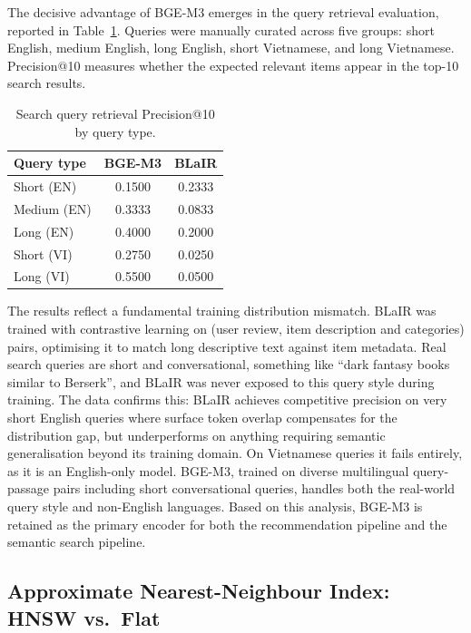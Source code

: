 The decisive advantage of BGE-M3 emerges in the query retrieval evaluation, reported in Table~\ref{tab:query_retrieval}.
Queries were manually curated across five groups: short English, medium English, long English, short Vietnamese, and long Vietnamese.
Precision@10 measures whether the expected relevant items appear in the top-10 search results.

\begin{table}[H]
\centering
\caption{Search query retrieval Precision@10 by query type.}
\label{tab:query_retrieval}
\begin{tabular}{lcc}
\hline
\textbf{Query type} & \textbf{BGE-M3} & \textbf{BLaIR} \\
\hline
Short (EN)    & 0.1500 & 0.2333 \\
Medium (EN)   & 0.3333 & 0.0833 \\
Long (EN)     & 0.4000 & 0.2000 \\
Short (VI)    & 0.2750 & 0.0250 \\
Long (VI)     & 0.5500 & 0.0500 \\
\hline
\end{tabular}
\end{table}

The results reflect a fundamental training distribution mismatch.
BLaIR was trained with contrastive learning on (user review, item description and categories) pairs, optimising it to match long descriptive text against item metadata.
Real search queries are short and conversational, something like ``dark fantasy books similar to Berserk'', and BLaIR was never exposed to this query style during training.
The data confirms this: BLaIR achieves competitive precision on very short English queries where surface token overlap compensates for the distribution gap, but underperforms on anything requiring semantic generalisation beyond its training domain.
On Vietnamese queries it fails entirely, as it is an English-only model.
BGE-M3, trained on diverse multilingual query-passage pairs including short conversational queries, handles both the real-world query style and non-English languages.
Based on this analysis, BGE-M3 is retained as the primary encoder for both the recommendation pipeline and the semantic search pipeline.

\subsection{Approximate Nearest-Neighbour Index: HNSW vs.\ Flat}
\label{sec:hnsw}

